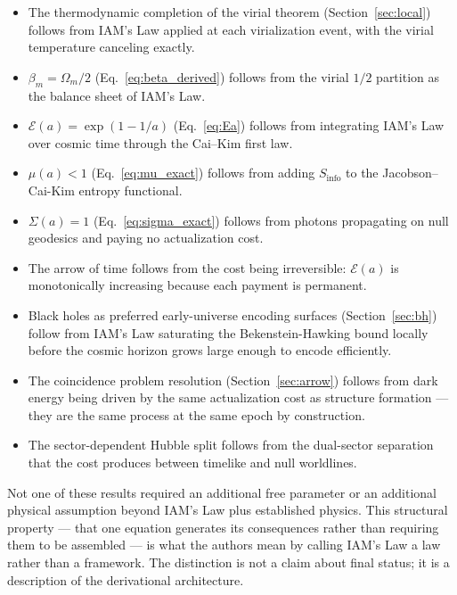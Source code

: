 \documentclass[12pt,a4paper]{article}
\begin{document}
\begin{itemize}
\item The thermodynamic completion of the virial theorem
  (Section~\ref{sec:local}) follows from IAM's Law applied at each
  virialization event, with the virial temperature canceling exactly.

\item $\beta_m = \Omega_m/2$ (Eq.~\ref{eq:beta_derived}) follows
  from the virial $1/2$ partition as the balance sheet of IAM's Law.

\item $\mathcal{E}(a) = \exp(1-1/a)$ (Eq.~\ref{eq:Ea}) follows
  from integrating IAM's Law over cosmic time through the
  Cai--Kim first law.

\item $\mu(a) < 1$ (Eq.~\ref{eq:mu_exact}) follows from adding
  $S_\mathrm{info}$ to the Jacobson--Cai-Kim entropy functional.

\item $\Sigma(a) = 1$ (Eq.~\ref{eq:sigma_exact}) follows from
  photons propagating on null geodesics and paying no actualization
  cost.

\item The arrow of time follows from the cost being irreversible:
  $\mathcal{E}(a)$ is monotonically increasing because each payment
  is permanent.

\item Black holes as preferred early-universe encoding surfaces
  (Section~\ref{sec:bh}) follow from IAM's Law saturating the
  Bekenstein-Hawking bound locally before the cosmic horizon
  grows large enough to encode efficiently.

\item The coincidence problem resolution (Section~\ref{sec:arrow})
  follows from dark energy being driven by the same actualization
  cost as structure formation --- they are the same process at
  the same epoch by construction.

\item The sector-dependent Hubble split follows from the dual-sector
  separation that the cost produces between timelike and null
  worldlines.
\end{itemize}

Not one of these results required an additional free parameter or an
additional physical assumption beyond IAM's Law plus established
physics. This structural property --- that one equation generates its
consequences rather than requiring them to be assembled --- is what
the authors mean by calling IAM's Law a law rather than a framework.
The distinction is not a claim about final status; it is a
description of the derivational architecture.
\end{document}

